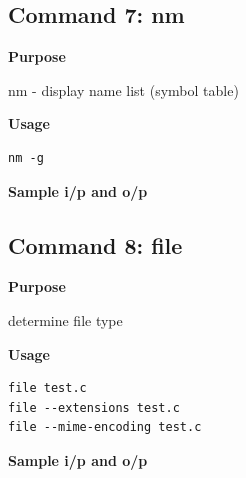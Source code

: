 \documentclass{article}
\begin{document}
\subsection{Command 7: nm} 
\textbf{Purpose}
\begin{flushleft}
       nm - display name list (symbol table)
\end{flushleft}
\textbf{Usage}
\begin{verbatim}
nm -g
\end{verbatim}
\textbf{Sample i/p and o/p}
\begin{figure}[H] 
\end{figure}
\subsection{Command 8: file} 
\textbf{Purpose}
\begin{flushleft}
 determine file type
\end{flushleft}
\textbf{Usage}
\begin{verbatim}
file test.c
file --extensions test.c
file --mime-encoding test.c
\end{verbatim}
\textbf{Sample i/p and o/p}
\begin{figure}[H] 
\end{figure}
\end{document}
